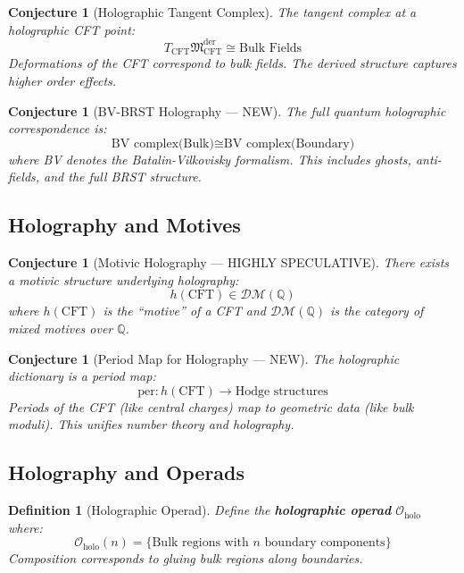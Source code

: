 \documentclass[12pt,a4paper]{article}
\newtheorem{conjecture}[theorem]{Conjecture}
\newtheorem{definition}[theorem]{Definition}
\begin{document}
\begin{conjecture}[Holographic Tangent Complex]
The tangent complex at a holographic CFT point:
\begin{equation}
T_{\text{CFT}} \mathfrak{M}_{\text{CFT}}^{\text{der}} \cong \text{Bulk Fields}
\end{equation}
Deformations of the CFT correspond to bulk fields. The derived structure captures higher order effects.
\end{conjecture}

\begin{conjecture}[BV-BRST Holography --- NEW]
The full quantum holographic correspondence is:
\begin{equation}
\text{BV complex(Bulk)} \cong \text{BV complex(Boundary)}
\end{equation}
where BV denotes the Batalin-Vilkovisky formalism. This includes ghosts, anti-fields, and the full BRST structure.
\end{conjecture}

\subsection{Holography and Motives}

\begin{conjecture}[Motivic Holography --- HIGHLY SPECULATIVE]
There exists a motivic structure underlying holography:
\begin{equation}
h(\text{CFT}) \in \mathcal{DM}(\mathbb{Q})
\end{equation}
where $h(\text{CFT})$ is the ``motive'' of a CFT and $\mathcal{DM}(\mathbb{Q})$ is the category of mixed motives over $\mathbb{Q}$.
\end{conjecture}

\begin{conjecture}[Period Map for Holography --- NEW]
The holographic dictionary is a period map:
\begin{equation}
\text{per}: h(\text{CFT}) \to \text{Hodge structures}
\end{equation}
Periods of the CFT (like central charges) map to geometric data (like bulk moduli). This unifies number theory and holography.
\end{conjecture}

\subsection{Holography and Operads}

\begin{definition}[Holographic Operad]
Define the \textbf{holographic operad} $\mathcal{O}_{\text{holo}}$ where:
\begin{equation}
\mathcal{O}_{\text{holo}}(n) = \{ \text{Bulk regions with } n \text{ boundary components} \}
\end{equation}
Composition corresponds to gluing bulk regions along boundaries.
\end{definition}
\end{document}
